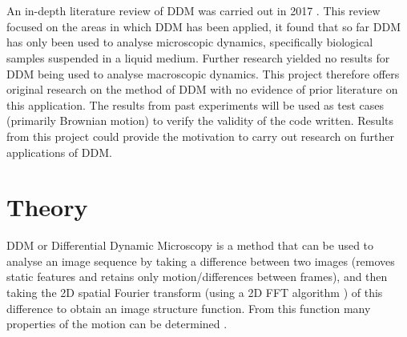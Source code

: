 \documentclass[11pt]{article}
\begin{document}
\\\\
An in-depth literature review of DDM was carried out in 2017 \cite{ddm1}. This review focused on the areas in which DDM has been applied, it found that so far DDM has only been used to analyse microscopic dynamics, specifically biological samples suspended in a liquid medium. Further research yielded no results for DDM being used to analyse macroscopic dynamics. This project therefore offers original research on the method of DDM with no evidence of prior literature on this application. The results from past experiments will be used as test cases (primarily Brownian motion) to verify the validity of the code written. Results from this project could provide the motivation to carry out research on further applications of DDM.

 
\section{Theory}
\label{section:theory}
DDM or Differential Dynamic Microscopy is a method that can be used to analyse an image sequence by taking a difference between two images (removes static features and retains only motion/differences between frames), and then taking the 2D spatial Fourier transform (using a 2D FFT algorithm \cite{fft}) of this difference to obtain an image structure function.
From this function many properties of the motion can be determined \cite{ddm1}.
\end{document}
